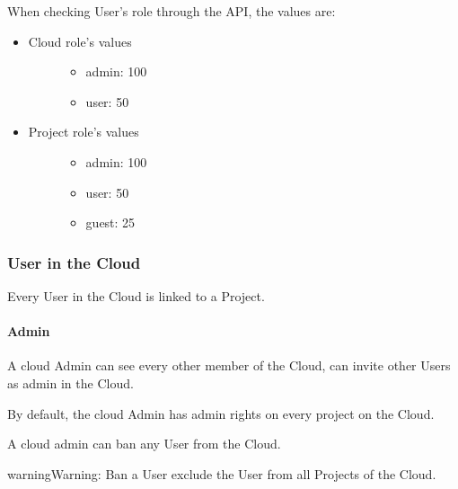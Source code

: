 \documentclass[a4paper,12pt,english]{sphinxmanual}
\begin{document}
When checking User’s role through the API, the values are:
\begin{itemize}
\item {} \begin{description}
\item[{Cloud role’s values}] \leavevmode\begin{itemize}
\item {} 
admin: 100

\item {} 
user: 50

\end{itemize}

\end{description}

\item {} \begin{description}
\item[{Project role’s values}] \leavevmode\begin{itemize}
\item {} 
admin: 100

\item {} 
user: 50

\item {} 
guest: 25

\end{itemize}

\end{description}

\end{itemize}


\subsubsection{User in the Cloud}
\label{\detokenize{tutorials/guided_tour:user-in-the-cloud}}
Every User in the Cloud is linked to a Project.


\paragraph{Admin}
\label{\detokenize{tutorials/guided_tour:admin}}
A cloud Admin can see every other member of the Cloud, can invite other Users as admin in the Cloud.

By default, the cloud Admin has admin rights on every project on the Cloud.

A cloud admin can ban any User from the Cloud.

\begin{sphinxadmonition}{warning}{Warning:}
Ban a User exclude the User from all Projects of the Cloud.
\end{sphinxadmonition}
\end{document}
